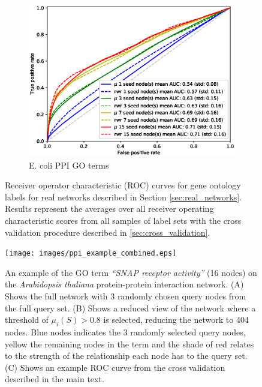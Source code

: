 \documentclass[sigconf]{acmart}
\begin{document}
\begin{figure}[t]
\begin{subfigure}[b]{0.31\textwidth}
    \end{subfigure}
    \begin{subfigure}[b]{0.31\textwidth}
        \centering
        \includegraphics[width=\textwidth]{images/rocs/ecoli_ppi_amigo.eps}
        \caption{E. coli PPI GO terms}
    \end{subfigure}
    \caption{Receiver operator characteristic (ROC) curves for gene ontology labels for real networks described in Section \ref{sec:real_networks}. 
    Results represent the averages over all receiver operating characteristic scores from all samples of label sets with the cross validation procedure described in \ref{sec:cross_validation}.}
    \label{fig:GO_TERM_ROCS}
\end{figure}

\begin{figure}[t]
\texttt{[image: images/ppi\_example\_combined.eps]}
\caption{An example of the GO term \textit{``SNAP receptor activity''} (16 nodes) on the \textit{Arabidopsis thaliana} protein-protein interaction network.
(A) Shows the full network with 3 randomly chosen query nodes from the full query set.
(B) Shows a reduced view of the network where a threshold of $\mu_i(S) > 0.8$ is selected, reducing the network to 404 nodes.
Blue nodes indicates the 3 randomly selected query nodes, yellow the remaining nodes in the term and the shade of red relates to the strength of the relationship each node has to the query set.
(C) Shows an example ROC curve from the cross validation described in the main text.
}
\label{fig:query_example}
\end{figure}
\end{document}

